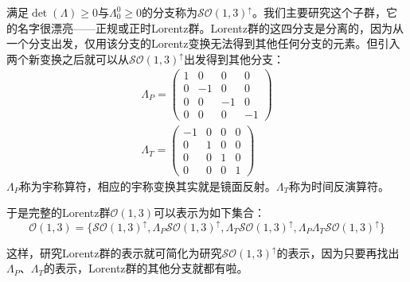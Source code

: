 满足$\det(\Lambda) \geq 0$与$\Lambda_0^0 \geq 0$的分支称为$\mathcal{SO}(1, 3)^{\uparrow}$。我们主要研究这个子群，它的名字很漂亮——正规或正时Lorentz群。Lorentz群的这四分支是分离的，因为从一个分支出发，仅用该分支的Lorentz变换无法得到其他任何分支的元素。但引入两个新变换之后就可以从$\mathcal{SO}(1, 3)^\uparrow$出发得到其他分支：
\begin{align}
	\label{equ3.132}
	\Lambda_P =
		\begin{pmatrix}
			1 & 0 & 0 & 0 \\
			0 & -1 & 0 & 0 \\
			0 & 0 & -1 & 0 \\
			0 & 0 & 0 & -1
		\end{pmatrix}
\\
	\label{equ3.133}
	\Lambda_T =
		\begin{pmatrix}
			-1 & 0 & 0 & 0 \\
			0 & 1 & 0 & 0 \\
			0 & 0 & 1 & 0 \\
			0 & 0 & 0 & 1
		\end{pmatrix}
\end{align}
$\Lambda_P$称为宇称算符，相应的宇称变换其实就是镜面反射。$\Lambda_T$称为时间反演算符。

于是完整的Lorentz群$\mathcal{O}(1, 3)$可以表示为如下集合：
\begin{equation}
	\label{equ3.134}
	\mathcal{O}(1, 3) = \{ \mathcal{SO}(1, 3)^\uparrow, \Lambda_P \mathcal{SO}(1, 3)^\uparrow, \Lambda_T \mathcal{SO}(1, 3)^\uparrow, \Lambda_P \Lambda_T \mathcal{SO}(1, 3)^\uparrow \}
\end{equation}

这样，研究Lorentz群的表示就可简化为研究$\mathcal{SO}(1, 3)^\uparrow$的表示，因为只要再找出$\Lambda_P$、$\Lambda_T$的表示，Lorentz群的其他分支就都有啦。

